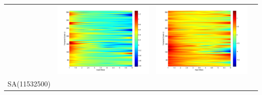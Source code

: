 \documentclass[11pt]{article}
\begin{document}
\begin{table}[H]
{\begin{tabular}{cccc}
&\begin{minipage}{.3\textwidth}\includegraphics[width=\linewidth]{resultgraph/05585000epdiff_former.png}\end{minipage}
&\begin{minipage}{.3\textwidth}\includegraphics[width=\linewidth]{resultgraph/05585000qdiff_former.png}\end{minipage}
\\
SA(11532500)

\end{tabular}}
\end{table}
\end{document}
